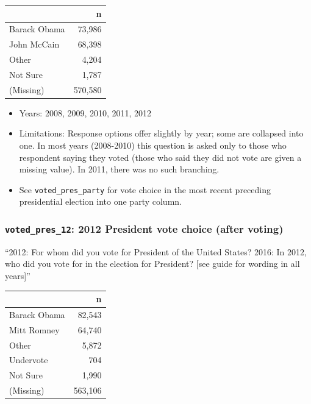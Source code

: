 \documentclass[10pt,article,oneside]{memoir}
\begin{document}
\begin{table}[H]
\centering
\begin{tabular}[t]{lr}
\toprule
 & n\\
\midrule
Barack Obama & 73,986\\
John McCain & 68,398\\
Other & 4,204\\
Not Sure & 1,787\\
(Missing) & 570,580\\
\bottomrule
\end{tabular}
\end{table}

\begin{itemize}
\tightlist
\item
  Years: 2008, 2009, 2010, 2011, 2012
\item
  Limitations: Response options offer slightly by year; some are
  collapsed into one. In most years (2008-2010) this question is asked
  only to those who respondent saying they voted (those who said they
  did not vote are given a missing value). In 2011, there was no such
  branching.
\item
  See \texttt{voted\_pres\_party} for vote choice in the most recent
  preceding presidential election into one party column.
\end{itemize}

\subsubsection{\texorpdfstring{\texttt{voted\_pres\_12}: 2012 President
vote choice (after
voting)}{voted\_pres\_12: 2012 President vote choice (after voting)}}\label{voted_pres_12-2012-president-vote-choice-after-voting}

``2012: For whom did you vote for President of the United States? 2016:
In 2012, who did you vote for in the election for President? {[}see
guide for wording in all years{]}''

\begin{table}[H]
\centering
\begin{tabular}[t]{lr}
\toprule
 & n\\
\midrule
Barack Obama & 82,543\\
Mitt Romney & 64,740\\
Other & 5,872\\
Undervote & 704\\
Not Sure & 1,990\\
(Missing) & 563,106\\
\bottomrule
\end{tabular}
\end{table}
\end{document}
